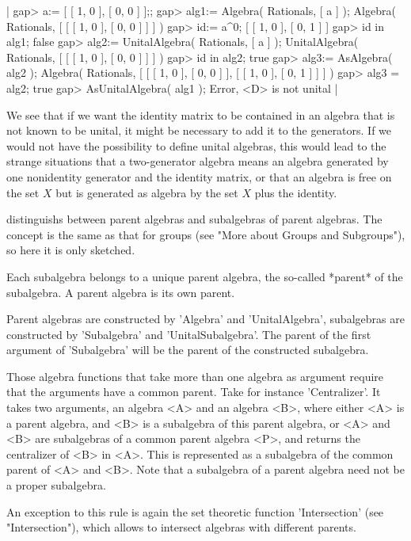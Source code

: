 |    gap> a:= [ [ 1, 0 ], [ 0, 0 ] ];;
    gap> alg1:= Algebra( Rationals, [ a ] );
    Algebra( Rationals, [ [ [ 1, 0 ], [ 0, 0 ] ] ] )
    gap> id:= a^0;
    [ [ 1, 0 ], [ 0, 1 ] ]
    gap> id in alg1;
    false
    gap> alg2:= UnitalAlgebra( Rationals, [ a ] );
    UnitalAlgebra( Rationals, [ [ [ 1, 0 ], [ 0, 0 ] ] ] )
    gap> id in alg2;
    true
    gap> alg3:= AsAlgebra( alg2 );
    Algebra( Rationals, [ [ [ 1, 0 ], [ 0, 0 ] ], [ [ 1, 0 ], [ 0, 1 ] ]
     ] )
    gap> alg3 = alg2;
    true
    gap> AsUnitalAlgebra( alg1 );
    Error, <D> is not unital |

We see that if we want the identity matrix to be contained in an algebra
that is not known to be unital, it might be necessary to add it to the
generators.  If we would not have the possibility to define unital
algebras, this would lead to the strange situations that a two-generator
algebra means an algebra generated by one nonidentity generator and the
identity matrix, or that an algebra is free on the set $X$ but is
generated as algebra by the set $X$ plus the identity.


{\GAP} distinguishs between parent algebras and subalgebras of parent
algebras.  The concept is the same as that for groups (see "More about
Groups and Subgroups"), so here it is only sketched.

Each subalgebra belongs to  a unique parent algebra, the so-called
*parent* of the subalgebra.  A parent algebra is its own parent.

Parent algebras are constructed by 'Algebra' and 'UnitalAlgebra',
subalgebras are constructed by 'Subalgebra' and 'UnitalSubalgebra'.
The parent of the first argument of 'Subalgebra' will be the parent of the
constructed subalgebra.

Those algebra functions that take more than one algebra as argument
require that  the arguments  have a  common parent.  Take for  instance
'Centralizer'.  It takes two  arguments, an algebra <A> and an algebra
<B>, where either <A> is a parent algebra, and <B> is a subalgebra of
this parent  algebra, or <A> and <B> are subalgebras of a common parent
algebra <P>, and  returns the centralizer of <B> in <A>.  This is
represented as a subalgebra of the common parent of <A> and <B>.
Note that a subalgebra of a parent algebra need not be a proper
subalgebra.

An exception to this rule is again the set theoretic function
'Intersection' (see "Intersection"), which  allows to intersect algebras
with different parents.

